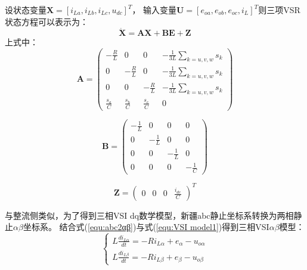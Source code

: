 设状态变量$\boldsymbol{X}=[i_{La},i_{Lb},i_{Lc},u_{dc}]^{T}$，
输入变量$\boldsymbol{U}=[e_{oa},e_{ob},e_{oc},i_{L}]^{T}$则三项VSR状态方程可以表示为：
\begin{equation}
	\boldsymbol{\dot{X}}=\boldsymbol{A}\boldsymbol{X}+\boldsymbol{B}\boldsymbol{E}+\boldsymbol{Z}
\end{equation}
上式中：
\begin{equation}
	\boldsymbol{A}=
	\begin{pmatrix}
		-\frac{R}{L}    & 0               & 0               & - \frac{1}{3L} \sum\limits_{k=u,v,w} s_{k} \\
		0               & -\frac{R}{L}    & 0               & - \frac{1}{3L} \sum\limits_{k=u,v,w} s_{k} \\
		0               & 0               & -\frac{R}{L}    & - \frac{1}{3L} \sum\limits_{k=u,v,w} s_{k} \\
		\frac{s_{a}}{C} & \frac{s_{b}}{C} & \frac{s_{c}}{C} & 0
	\end{pmatrix}
\end{equation}

\begin{equation}
	\boldsymbol{B}=
	\begin{pmatrix}
		-\frac{1}{L} & 0            & 0            & 0            \\
		0            & -\frac{1}{L} & 0            & 0            \\
		0            & 0            & -\frac{1}{L} & 0            \\
		0            & 0            & 0            & -\frac{1}{C}
	\end{pmatrix}
\end{equation}

\begin{equation}
	\boldsymbol{Z}=
	\begin{pmatrix}
		0 & 0 & 0 & \frac{i_{dc}}{C}
	\end{pmatrix}^{T}
\end{equation}

与整流侧类似，为了得到三相VSI dq数学模型，新疆abc静止坐标系转换为两相静止$\alpha\beta$坐标系。
结合式(\ref{equ:abc2αβ})与式(\ref{equ:VSI model1})得到三相VSI$\alpha\beta$模型：
\begin{equation}
	\begin{cases}
		L\frac{di_{L\alpha}}{dt}=-Ri_{L\alpha}+e_{\alpha}-u_{o\alpha} \\
		L\frac{di_{L\beta}}{dt}=-Ri_{L\beta}+e_{\beta}-u_{o\beta}
	\end{cases}
	\label{equ:VSI αβ model1}
\end{equation}

